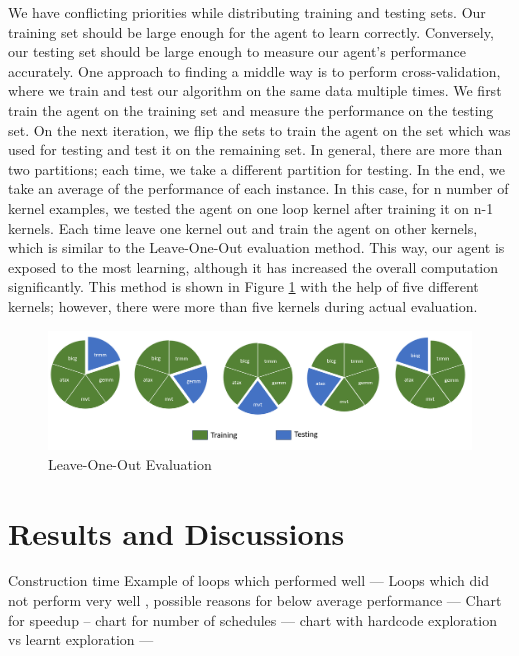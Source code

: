\documentclass[logo,msc]{infthesis}           %
\begin{document}
We have conflicting priorities while distributing training and testing sets. Our training set should be large enough for the agent to learn correctly. Conversely, our testing set should be large enough to measure our agent's performance accurately. One approach to finding a middle way is to perform cross-validation, where we train and test our algorithm on the same data multiple times. We first train the agent on the training set and measure the performance on the testing set. On the next iteration, we flip the sets to train the agent on the set which was used for testing and test it on the remaining set. In general, there are more than two partitions; each time, we take a different partition for testing. In the end, we take an average of the performance of each instance. In this case, for n number of kernel examples, we tested the agent on one loop kernel after training it on n-1 kernels. Each time leave one kernel out and train the agent on other kernels, which is similar to the Leave-One-Out evaluation method. This way, our agent is exposed to the most learning, although it has increased the overall computation significantly. This method is shown in Figure \ref{fig:leave_one_out} with the help of five different kernels; however, there were more than five kernels during actual evaluation.

\begin{figure}[htbp]
  \centering
  \includegraphics[width=\textwidth]{Images/Leave_One_Out.png}   
  \caption{Leave-One-Out Evaluation}
  \label{fig:leave_one_out} 
\end{figure}

\chapter{Results and Discussions}
Construction time
Example of loops which performed well ---
Loops which did not perform very well , possible reasons for below average performance --- 
Chart for speedup -- 
chart for number of schedules ---
chart with hardcode exploration vs learnt exploration ---
\end{document}
